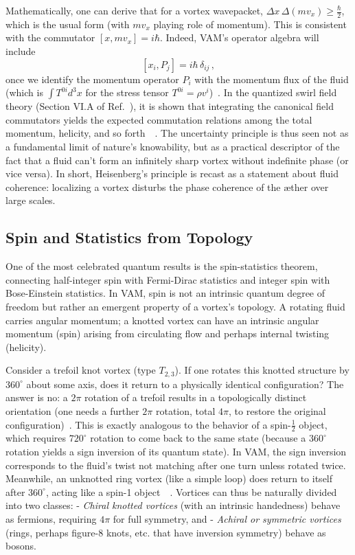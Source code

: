 \documentclass[preprint]{revtex4-2}
\begin{document}
    Mathematically, one can derive that for a vortex wavepacket, $\Delta x\, \Delta (m v_x) \ge \frac{\hbar}{2}$, which is the usual form (with $m v_x$ playing role of momentum). This is consistent with the commutator $[x, m v_x] = i\hbar$. Indeed, VAM’s operator algebra will include
    \[
        [x_i, P_j] = i\hbar\,\delta_{ij}\,,
    \]
    once we identify the momentum operator $P_i$ with the momentum flux of the fluid (which is $\int T^{0i} d^3x$ for the stress tensor $T^{0i} = \rho v^i$)~\cite{reference_76}. In the quantized swirl field theory (Section VI.A of Ref.~\cite{reference_0}), it is shown that integrating the canonical field commutators yields the expected commutation relations among the total momentum, helicity, and so forth~\cite{reference_77}~\cite{reference_78}. The uncertainty principle is thus seen not as a fundamental limit of nature’s knowability, but as a practical descriptor of the fact that a fluid can’t form an infinitely sharp vortex without indefinite phase (or vice versa). In short, Heisenberg’s principle is recast as a statement about fluid coherence: localizing a vortex disturbs the phase coherence of the æther over large scales.

    \subsection{Spin and Statistics from Topology}
    One of the most celebrated quantum results is the spin-statistics theorem, connecting half-integer spin with Fermi-Dirac statistics and integer spin with Bose-Einstein statistics. In VAM, spin is not an intrinsic quantum degree of freedom but rather an emergent property of a vortex’s topology. A rotating fluid carries angular momentum; a knotted vortex can have an intrinsic angular momentum (spin) arising from circulating flow and perhaps internal twisting (helicity).

    Consider a trefoil knot vortex (type $T_{2,3}$). If one rotates this knotted structure by $360^\circ$ about some axis, does it return to a physically identical configuration? The answer is no: a $2\pi$ rotation of a trefoil results in a topologically distinct orientation (one needs a further $2\pi$ rotation, total $4\pi$, to restore the original configuration)~\cite{reference_79}. This is exactly analogous to the behavior of a spin-$\frac{1}{2}$ object, which requires $720^\circ$ rotation to come back to the same state (because a $360^\circ$ rotation yields a sign inversion of its quantum state). In VAM, the sign inversion corresponds to the fluid's twist not matching after one turn unless rotated twice. Meanwhile, an unknotted ring vortex (like a simple loop) does return to itself after $360^\circ$, acting like a spin-1 object~\cite{reference_80}~\cite{reference_81}. Vortices can thus be naturally divided into two classes:
    - \emph{Chiral knotted vortices} (with an intrinsic handedness) behave as fermions, requiring $4\pi$ for full symmetry, and
    - \emph{Achiral or symmetric vortices} (rings, perhaps figure-8 knots, etc. that have inversion symmetry) behave as bosons.
\end{document}
